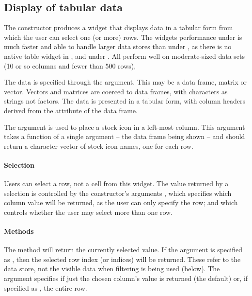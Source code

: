 \subsection{Display of tabular data}
\label{sec:gWidgets-tabular-data-display}


The  constructor produces a widget that displays
data in a tabular form from which the user can select one (or more)
rows. The widgets performance under  is much faster
and able to handle larger data stores than under ,
as there is no native table widget in \tcltk, and under
. All perform well on moderate-sized data sets (10 or
so columns and fewer than 500 rows),

The data is specified through the 
argument. This may be a data frame, matrix or vector. Vectors and
matrices are coerced to data frames, with characters as strings not
factors.  The data is presented in a
tabular form, with column headers derived from the 
attribute of the data frame.  

The  argument
is used to place a stock icon in a left-most column.  This argument
takes a function of a single argument -- the data frame being shown --
and should return a character vector of stock icon names, one for each
row.

\paragraph{Selection}
Users can select a row, not a cell from this widget. The value returned by a selection is
controlled by the constructor's arguments , which
specifies which column value will be returned, as the user can only
specify the row; and  which controls
whether the user may select more than one row.  


\paragraph{Methods}
The  method will return the currently selected
value. If the argument  is specified as , then
the selected row index (or indices) will be returned. These refer to
the data store, not the visible data when filtering is being used (below). The
argument  specifies if just the chosen column's value is
returned (the default) or, if specified as , the entire row.
 
